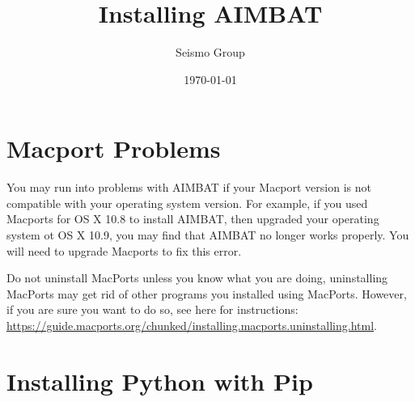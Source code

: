 \documentclass[letterpaper,10pt]{article}
\title{Installing AIMBAT}
\author{Seismo Group}
\date{\today}
\begin{document}
\maketitle


\section{Macport Problems}

You may run into problems with AIMBAT if your Macport version is not compatible with your operating system version. For example, if you used Macports for OS X 10.8 to install AIMBAT, then upgraded your operating system ot OS X 10.9, you may find that AIMBAT no longer works properly. You will need to upgrade Macports to fix this error.

Do not uninstall MacPorts unless you know what you are doing, uninstalling MacPorts may get rid of other programs you installed using MacPorts. However, if you are sure you want to do so, see here for instructions: \url{https://guide.macports.org/chunked/installing.macports.uninstalling.html}. 





\section{Installing Python with Pip}
\end{document}
